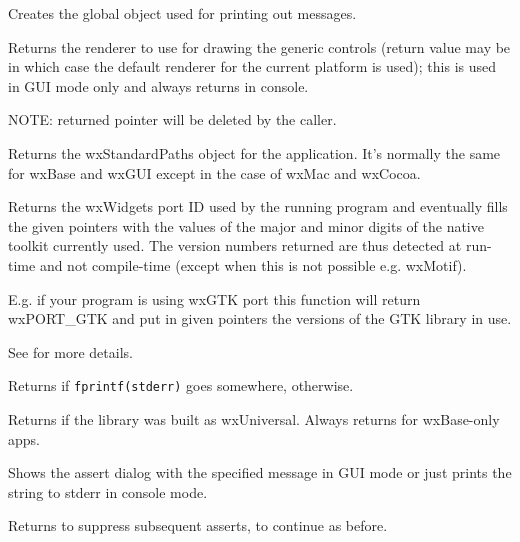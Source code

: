 
Creates the global object used for printing out messages.


\label{wxapptraitscreaterenderer}


Returns the renderer to use for drawing the generic controls (return value may be \NULL
in which case the default renderer for the current platform is used);
this is used in GUI mode only and always returns \NULL in console.

NOTE: returned pointer will be deleted by the caller.


\label{wxapptraitsgetstandardpaths}


Returns the wxStandardPaths object for the application.
It's normally the same for wxBase and wxGUI except in the case of wxMac and wxCocoa.

\label{wxapptraitsgettoolkitversion}


Returns the wxWidgets port ID used by the running program and eventually
fills the given pointers with the values of the major and minor digits
of the native toolkit currently used.
The version numbers returned are thus detected at run-time and not compile-time
(except when this is not possible e.g. wxMotif).

E.g. if your program is using wxGTK port this function will return wxPORT\_GTK and
put in given pointers the versions of the GTK library in use.

See  for more details.


\label{wxapptraitshasstderr}


Returns \true if {\tt fprintf(stderr)} goes somewhere, \false otherwise.


\label{wxapptraitsisusinguniversalwidgets}


Returns \true if the library was built as wxUniversal. Always returns
\false for wxBase-only apps.


\label{wxapptraitsshowassertdialog}


Shows the assert dialog with the specified message in GUI mode or just prints
the string to stderr in console mode.

Returns \true to suppress subsequent asserts, \false to continue as before.

